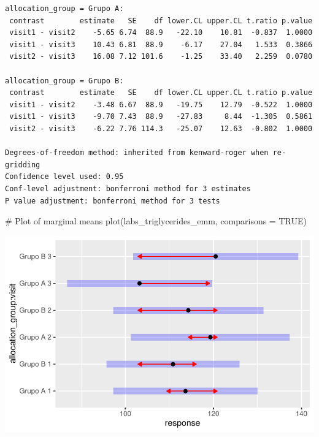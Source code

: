 \documentclass[
  letterpaper,
  DIV=11,
  numbers=noendperiod]{scrartcl}
\newenvironment{Shaded}{\begin{snugshade}}{\end{snugshade}}
\newcommand{\AttributeTok}[1]{\textcolor[rgb]{0.40,0.45,0.13}{#1}}
\newcommand{\CommentTok}[1]{\textcolor[rgb]{0.37,0.37,0.37}{#1}}
\newcommand{\ConstantTok}[1]{\textcolor[rgb]{0.56,0.35,0.01}{#1}}
\newcommand{\FunctionTok}[1]{\textcolor[rgb]{0.28,0.35,0.67}{#1}}
\newcommand{\NormalTok}[1]{\textcolor[rgb]{0.00,0.23,0.31}{#1}}
\begin{document}
\begin{verbatim}
allocation_group = Grupo A:
 contrast        estimate   SE    df lower.CL upper.CL t.ratio p.value
 visit1 - visit2    -5.65 6.74  88.9   -22.10    10.81  -0.837  1.0000
 visit1 - visit3    10.43 6.81  88.9    -6.17    27.04   1.533  0.3866
 visit2 - visit3    16.08 7.12 101.6    -1.25    33.40   2.259  0.0780

allocation_group = Grupo B:
 contrast        estimate   SE    df lower.CL upper.CL t.ratio p.value
 visit1 - visit2    -3.48 6.67  88.9   -19.75    12.79  -0.522  1.0000
 visit1 - visit3    -9.70 7.43  88.9   -27.83     8.44  -1.305  0.5861
 visit2 - visit3    -6.22 7.76 114.3   -25.07    12.63  -0.802  1.0000

Degrees-of-freedom method: inherited from kenward-roger when re-gridding 
Confidence level used: 0.95 
Conf-level adjustment: bonferroni method for 3 estimates 
P value adjustment: bonferroni method for 3 tests 
\end{verbatim}

\begin{Shaded}
\begin{Highlighting}[]
\CommentTok{\# Plot of marginal means}
\FunctionTok{plot}\NormalTok{(labs\_triglycerides\_emm, }\AttributeTok{comparisons =} \ConstantTok{TRUE}\NormalTok{)}
\end{Highlighting}
\end{Shaded}

\includegraphics{Outcomes_V1V2V3_files/figure-pdf/labs_triglycerides_sens_emm-1.pdf}
\end{document}
